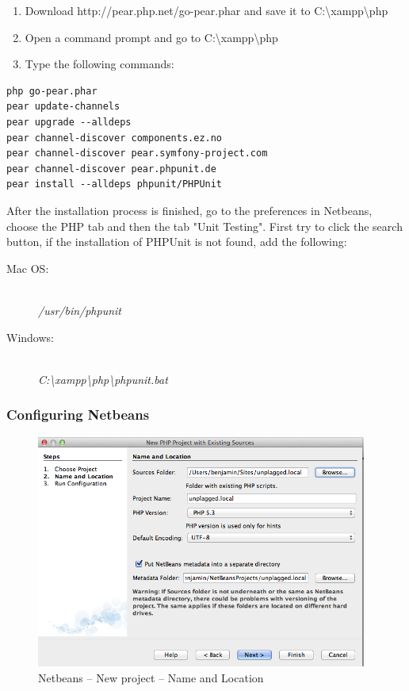 \begin{enumerate}
\item Download http://pear.php.net/go-pear.phar and save it to C:\textbackslash xampp\textbackslash php
\item Open a command prompt and go to C:\textbackslash xampp\textbackslash php
\item Type the following commands:
\end{enumerate}
\begin{lstlisting}[caption=Setting up PHPUnit on Windows]
php go-pear.phar
pear update-channels
pear upgrade --alldeps
pear channel-discover components.ez.no
pear channel-discover pear.symfony-project.com
pear channel-discover pear.phpunit.de
pear install --alldeps phpunit/PHPUnit
\end{lstlisting}

After the installation process is finished, go to the preferences in Netbeans, choose the PHP tab and then the tab "Unit Testing". First try to click the search button, if the installation of PHPUnit is not found, add the following:

\begin{description}
\item [Mac OS:] \hfill \\
\textit{/usr/bin/phpunit}
\item [Windows:] \hfill \\
\textit{C:\textbackslash xampp\textbackslash php\textbackslash phpunit.bat}
\end{description}

\subsubsection{Configuring Netbeans}

\begin{figure}[htbp]
  \centering
    \includegraphics[width=0.97\textwidth]{images/netbeans/01_new_project.png}
  \caption{Netbeans -- New project -- Name and Location}
  \label{fig:newProjectPart1}
\end{figure}

